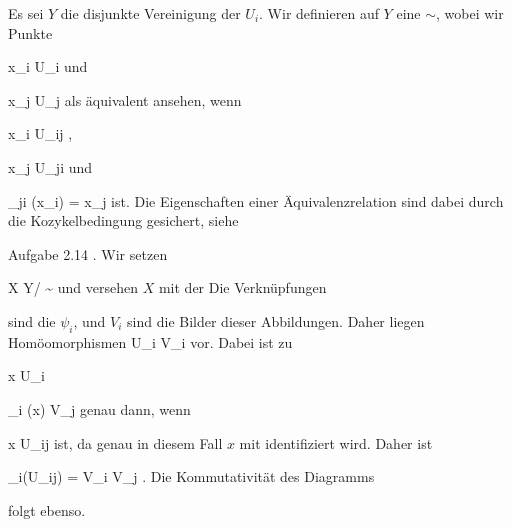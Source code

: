 {





Es sei $Y$ die disjunkte Vereinigung der $U_i$. Wir definieren auf $Y$ eine
$\sim$, wobei wir Punkte

\mavergleichskette
{\vergleichskette
{ x_i
}
{ \in }{ U_i
}
{  }{
}
{    }{
}
{   }{
}
}
{}{}{}
und

\mavergleichskette
{\vergleichskette
{ x_j
}
{ \in }{ U_j
}
{  }{
}
{    }{
}
{   }{
}
}
{}{}{}
als äquivalent ansehen, wenn

\mavergleichskette
{\vergleichskette
{ x_i
}
{ \in }{ U_{ij}
}
{  }{
}
{    }{
}
{   }{
}
}
{}{}{,}

\mavergleichskette
{\vergleichskette
{ x_j
}
{ \in }{ U_{ji}
}
{  }{
}
{    }{
}
{   }{
}
}
{}{}{}
und

\mavergleichskette
{\vergleichskette
{ \varphi_{ji} (x_i)
}
{ = }{ x_j
}
{  }{
}
{    }{
}
{   }{
}
}
{}{}{}
ist. Die Eigenschaften einer Äquivalenzrelation sind dabei durch die Kozykelbedingung gesichert, siehe

Aufgabe 2.14
.
Wir setzen

\mavergleichskettedisp
{\vergleichskette
{X
}
{ } { Y/ \sim
}
{ } {
}
{ } {
}
{ } {
}
}
{}{}{}
und versehen $X$ mit der
Die Verknüpfungen

 {  }

sind die $\psi_i$, und $V_i$ sind die Bilder dieser Abbildungen. Daher liegen Homöomorphismen
 {U_i } { V_i
} {}
vor. Dabei ist zu

\mavergleichskette
{\vergleichskette
{ x
}
{ \in }{ U_i
}
{  }{
}
{    }{
}
{   }{
}
}
{}{}{}

\mavergleichskettedisp
{\vergleichskette
{ \psi_i (x)
}
{ \in} { V_j
}
{ } {
}
{ } {
}
{ } {
}
}
{}{}{}
genau dann, wenn

\mavergleichskette
{\vergleichskette
{ x
}
{ \in }{ U_{ij}
}
{  }{
}
{    }{
}
{   }{
}
}
{}{}{}
ist, da genau in diesem Fall $x$ mit
 identifiziert wird. Daher ist

\mavergleichskette
{\vergleichskette
{ \psi_i(U_{ij})
}
{ = }{ V_i \cap V_j
}
{  }{
}
{    }{
}
{   }{
}
}
{}{}{.}
Die Kommutativität des Diagramms

 {  }

folgt ebenso.




}






